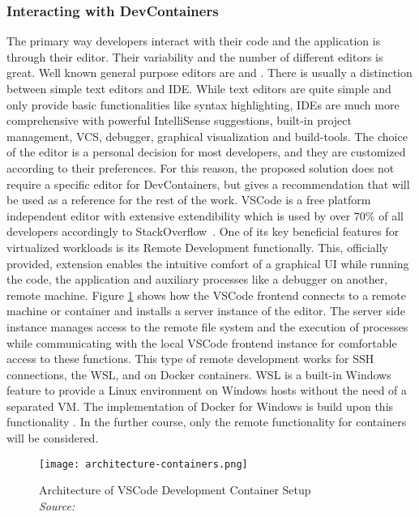         \subsubsection{Interacting with DevContainers}
        The primary way developers interact with their code and the application is through their editor. Their variability and the number of different editors is great. Well known general purpose editors are  and . There is usually a distinction between simple text editors and \acl{IDE}. While text editors are quite simple and only provide basic functionalities like syntax highlighting, \ac{IDE}s are much more comprehensive with powerful IntelliSense suggestions, built-in project management, \ac{VCS}, debugger, graphical visualization and build-tools. The choice of the editor is a personal decision for most developers, and they are customized according to their preferences. For this reason, the proposed solution does not require a specific editor for DevContainers, but gives a recommendation that will be used as a reference for the rest of the work.\newline
        \ac{VSCode} is a free platform independent editor with extensive extendibility which is used by over 70\% of all developers accordingly to StackOverflow~\cite{stackoverflow2021}. One of its key beneficial features for virtualized workloads is its Remote Development functionally. This, officially provided, extension enables the intuitive comfort of a graphical \ac{UI} while running the code, the application and auxiliary processes like a debugger on another, remote machine. Figure \ref{fig::vscodecontainer} shows how the \ac{VSCode} frontend connects to a remote machine or container and installs a server instance of the editor. The server side instance manages access to the remote file system and the execution of processes while communicating with the local \ac{VSCode} frontend instance for comfortable access to these functions. This type of remote development works for \ac{SSH} connections, the \ac{WSL}, and on Docker containers. \ac{WSL} is a built-in Windows feature to provide a Linux environment on Windows hosts without the need of a separated \ac{VM}. The implementation of Docker for Windows is build upon this functionality \cite{vscodedevcontainer}. In the further course, only the remote functionality for containers will be considered.
        \begin{figure}[]
            \centering
            \texttt{[image: architecture-containers.png]}
            \caption{Architecture of \ac{VSCode} Development Container Setup \\\textit{Source:~\cite{vscodedevcontainer}}}\label{fig::vscodecontainer}
        \end{figure}
